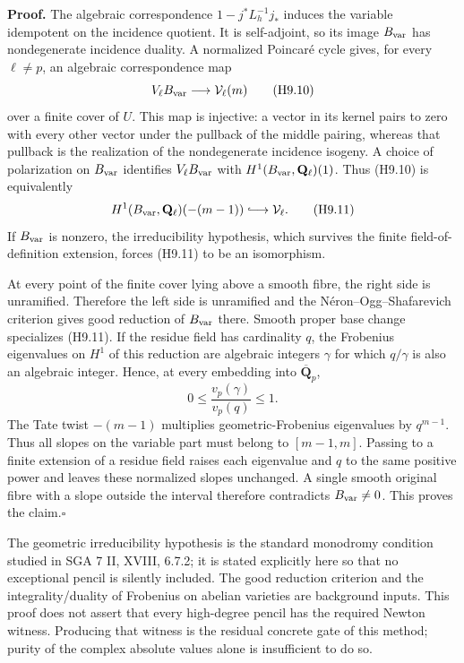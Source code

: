 \textbf{Proof.}
The algebraic correspondence $1-j^*L_h^{-1}j_*$ induces the variable
idempotent on the incidence quotient. It is self-adjoint, so its image
$B_{\rm var}$ has nondegenerate incidence duality. A normalized Poincar\'e
cycle gives, for every $\ell\ne p$, an algebraic correspondence map
\[
 V_\ell B_{\rm var}\longrightarrow\mathcal V_\ell(m)
                                                        \tag{H9.10}
\]
over a finite cover of $U$. This map is injective: a vector in its
kernel pairs to zero with every other vector under the pullback of the
middle pairing, whereas that pullback is the realization of the
nondegenerate incidence isogeny. A choice of polarization on
$B_{\rm var}$ identifies $V_\ell B_{\rm var}$ with
$H^1(B_{\rm var},\mathbf Q_\ell)(1)$. Thus (H9.10) is equivalently
\[
 H^1(B_{\rm var},\mathbf Q_\ell)(-(m-1))
       \lhook\joinrel\longrightarrow\mathcal V_\ell.       \tag{H9.11}
\]
If $B_{\rm var}$ is nonzero, the irreducibility hypothesis, which survives
the finite field-of-definition extension, forces (H9.11) to be an
isomorphism.

At every point of the finite cover lying above a smooth fibre, the
right side is unramified. Therefore the left side is unramified and
the N\'eron--Ogg--Shafarevich criterion gives good reduction of
$B_{\rm var}$ there. Smooth proper base change specializes (H9.11).
If the residue field has cardinality $q$, the Frobenius eigenvalues on
$H^1$ of this reduction are algebraic integers $\gamma$ for which
$q/\gamma$ is also an algebraic integer. Hence, at every embedding into
$\overline{\mathbf Q}_p$,
\[
 0\leq\frac{v_p(\gamma)}{v_p(q)}\leq1.
\]
The Tate twist $-(m-1)$ multiplies geometric-Frobenius eigenvalues by
$q^{m-1}$. Thus all slopes on the variable part must belong to
$[m-1,m]$. Passing to a finite extension of a residue field raises
each eigenvalue and $q$ to the same positive power and leaves these
normalized slopes unchanged. A single smooth original fibre with a
slope outside the interval therefore contradicts $B_{\rm var}\ne0$.
This proves the claim.\hfill$\square$

The geometric irreducibility hypothesis is the standard monodromy
condition studied in SGA 7 II, XVIII, 6.7.2; it is stated explicitly
here so that no exceptional pencil is silently included. The good
reduction criterion and the integrality/duality of Frobenius on abelian
varieties are background inputs. This proof does not assert that every
high-degree pencil has the required Newton witness. Producing that
witness is the residual concrete gate of this method; purity of the
complex absolute values alone is insufficient to do so.
